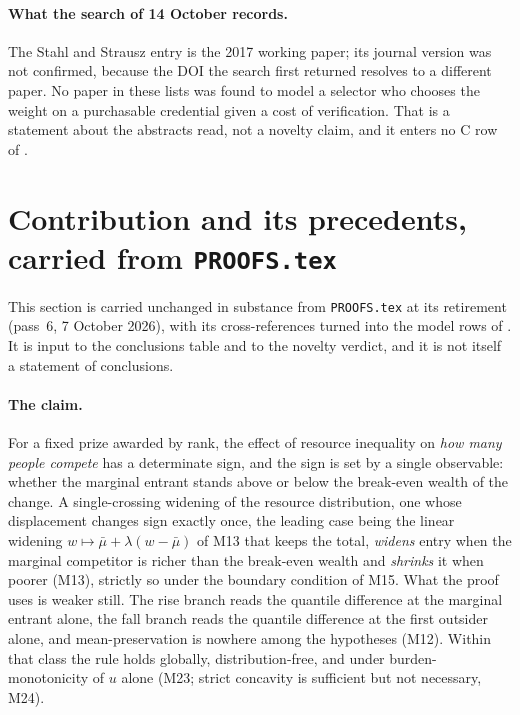 \documentclass[11pt,a4paper]{article}
\begin{document}
\paragraph{What the search of 14 October records.} The Stahl and Strausz entry is the 2017
working paper; its journal version was not confirmed, because the DOI the
search first returned resolves to a different paper. No paper in these lists
was found to model a selector who chooses the weight on a purchasable
credential given a cost of verification. That is a statement about the
abstracts read, not a novelty claim, and it enters no C row of
.

\section{Contribution and its precedents, carried from \texttt{PROOFS.tex}}
\label{sec:contribution-carried}

This section is carried unchanged in substance from \texttt{PROOFS.tex} at its
retirement (pass~6, 7 October 2026), with its cross-references turned into the
model rows of . It is input to the conclusions table and
to the novelty verdict, and it is not itself a statement of conclusions.

\paragraph{The claim.} For a fixed prize awarded by rank, the effect of
resource inequality on \emph{how many people compete} has a determinate sign,
and the sign is set by a single observable: whether the marginal entrant
stands above or below the break-even wealth of the change. A single-crossing
widening of the resource distribution, one whose displacement changes sign
exactly once, the leading case being the linear widening
$w\mapsto\bar\mu+\lambda(w-\bar\mu)$ of M13 that keeps the total,
\emph{widens} entry when the marginal competitor is richer than the break-even
wealth and
\emph{shrinks} it when poorer (M13), strictly so under the
boundary condition of M15. What the proof uses is
weaker still. The rise branch reads the quantile difference at the marginal
entrant alone, the fall branch reads the quantile difference at the first
outsider alone, and mean-preservation is nowhere among the hypotheses
(M12). Within that class the rule holds globally,
distribution-free, and under burden-monotonicity of $u$ alone
(M23; strict concavity is sufficient but not necessary,
M24).
\end{document}
